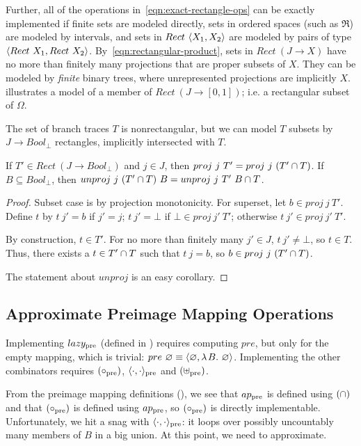 Further, all of the operations in~\eqref{eqn:exact-rectangle-ops} can be exactly implemented if finite sets are modeled directly, sets in ordered spaces (such as $\Re$) are modeled by intervals, and sets in $Rect~\langle{X_1,X_2}\rangle$ are modeled by pairs of type $\langle{Rect~X_1,Rect~X_2}\rangle$.
By~\eqref{eqn:rectangular-product}, sets in $Rect~(J \to X)$ have no more than finitely many projections that are proper subsets of $X$.
They can be modeled by \emph{finite} binary trees, where unrepresented projections are implicitly $X$.  illustrates a model of a member of $Rect~(J \to [0,1])$; i.e. a rectangular subset of $\Omega$.

The set of branch traces $T$ is nonrectangular, but we can model $T$ subsets by $J \to Bool_\bot$ rectangles, implicitly intersected with $T$.

\begin{theorem}[$T$ model]
If $T' \in Rect~(J \to Bool_\bot)$ and $j \in J$, then $proj~j~T' = proj~j~(T' \cap T)$.
If $B \subseteq Bool_\bot$, then $unproj~j~(T' \cap T)~B = unproj~j~T'~B \cap T$.
\end{theorem}
\begin{proof}
Subset case is by projection monotonicity.
For superset, let $b \in proj~j~T'$.
Define $t$ by $t~j' = b$ if $j' = j$; $t~j' = \bot$ if $\bot \in proj~j'~T'$; otherwise $t~j' \in proj~j'~T'$.

By construction, $t \in T'$.
For no more than finitely many $j' \in J$, $t~j' \neq \bot$, so $t \in T$.
Thus, there exists a $t \in T' \cap T$ such that $t~j = b$, so $b \in proj~j~(T' \cap T)$.

The statement about $unproj$ is an easy corollary.
\end{proof}

\subsection{Approximate Preimage Mapping Operations}

Implementing $lazy_\mathrm{pre}$ (defined in ) requires computing $pre$, but only for the empty mapping, which is trivial: $pre~\varnothing \equiv \langle{\varnothing,\lambda\mspace{2mu}{B}\ldotp\,\varnothing}\rangle$.
Implementing the other combinators requires $(\circ_\mathrm{pre})$, $\langle{\cdot,\cdot}\rangle_\mathrm{pre}$ and $(\uplus_\mathrm{pre})$.

From the preimage mapping definitions (), we see that $ap_\mathrm{pre}$ is defined using $(\cap)$ and that $(\circ_\mathrm{pre})$ is defined using $ap_\mathrm{pre}$, so $(\circ_\mathrm{pre})$ is directly implementable.
Unfortunately, we hit a snag with $\langle{\cdot,\cdot}\rangle_\mathrm{pre}$: it loops over possibly uncountably many members of $B$ in a big union.
At this point, we need to approximate.

